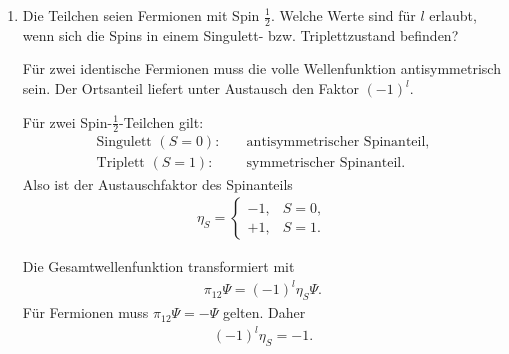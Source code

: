 \documentclass[11pt,a4paper]{scrartcl}
\newcommand{\Pex}{\pi_{12}}
\begin{document}
\begin{enumerate}[label=(\alph*)]
\begin{calculationbox}
\begin{calculationbox}[title=Bosonische Symmetriebedingung]
                \begin{solutionbox}[title=Erlaubte Werte für Spin-$0$-Bosonen]
                    \begin{align*}
                        l=0,2,4,\dots
                    \end{align*}
                    Für identische Spin-$0$-Bosonen sind nur gerade relative Drehimpulse erlaubt.
                \end{solutionbox}
            \end{calculationbox}
        \end{calculationbox}

        \item Die Teilchen seien Fermionen mit Spin $\frac12$. Welche Werte sind für $l$ erlaubt, wenn sich die Spins in einem Singulett- bzw. Triplettzustand befinden?

        \begin{calculationbox}
            Für zwei identische Fermionen muss die volle Wellenfunktion antisymmetrisch sein. Der Ortsanteil liefert unter Austausch den Faktor $(-1)^l$.

            \begin{calculationbox}[title=Spin-Symmetrie]
                Für zwei Spin-$\frac12$-Teilchen gilt:
                \begin{align*}
                    \text{Singulett }(S=0):&\quad \text{antisymmetrischer Spinanteil},\\
                    \text{Triplett }(S=1):&\quad \text{symmetrischer Spinanteil}.
                \end{align*}
                Also ist der Austauschfaktor des Spinanteils
                \begin{align*}
                    \eta_S=
                    \begin{cases}
                        -1, & S=0,\\
                        +1, & S=1.
                    \end{cases}
                \end{align*}
            \end{calculationbox}

            \begin{calculationbox}[title=Fermionische Antisymmetrie]
                Die Gesamtwellenfunktion transformiert mit
                \begin{align*}
                    \Pex\Psi=(-1)^l\eta_S\Psi.
                \end{align*}
                Für Fermionen muss $\Pex\Psi=-\Psi$ gelten. Daher
                \begin{align*}
                    (-1)^l\eta_S=-1.
                \end{align*}


\end{calculationbox}
\end{calculationbox}
\end{enumerate}
\end{document}
